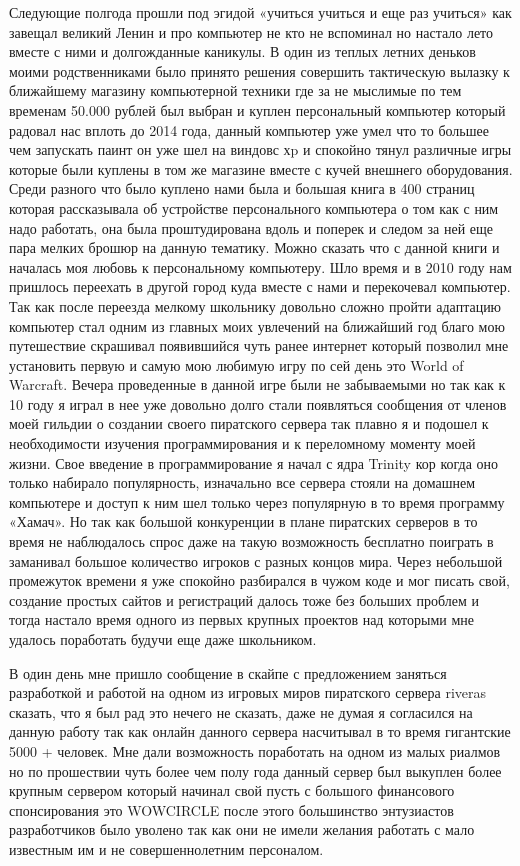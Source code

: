 \documentclass[14pt,a4paper,oneside]{extbook}
\begin{document}
		Следующие полгода прошли под эгидой «учиться учиться и еще раз учиться» как завещал великий Ленин и про компьютер не кто не вспоминал но настало лето вместе с ними и долгожданные каникулы. В один из теплых летних деньков моими родственниками было принято решения совершить тактическую вылазку к ближайшему магазину компьютерной техники где за не мыслимые по тем временам 50.000 рублей был выбран и куплен персональный компьютер который радовал нас вплоть до 2014 года, данный компьютер уже умел что то большее чем запускать паинт он уже шел на виндовс хp и спокойно тянул различные игры которые были куплены в том же магазине вместе с кучей внешнего оборудования. Среди разного что было куплено нами была и большая книга в 400 страниц которая рассказывала об устройстве персонального компьютера о том как с ним надо работать, она была проштудирована вдоль и поперек и следом за ней еще пара мелких брошюр на данную тематику. Можно сказать что с данной книги и началась моя любовь к персональному компьютеру. Шло время и в 2010 году нам пришлось переехать в другой город куда вместе с нами и перекочевал компьютер. Так как после переезда мелкому школьнику довольно сложно пройти адаптацию компьютер стал одним из главных моих увлечений на ближайший год благо мою путешествие скрашивал появившийся чуть ранее интернет который позволил мне установить первую и самую мою любимую игру по сей день это World of Warcraft. Вечера проведенные в данной игре были не забываемыми но так как к 10 году я играл в нее уже довольно долго стали появляться сообщения от членов моей гильдии о создании своего пиратского сервера так плавно я и подошел к необходимости изучения программирования и к переломному моменту моей жизни. Свое введение в программирование я начал с ядра Trinity кор когда оно только набирало популярность, изначально все сервера стояли на домашнем компьютере и доступ к ним шел только через популярную в то время программу «Хамач». Но так как большой конкуренции в плане пиратских серверов в то время не наблюдалось спрос даже на такую возможность бесплатно поиграть в заманивал большое количество игроков с разных концов мира. Через небольшой промежуток времени я уже спокойно разбирался в чужом коде и мог писать свой, создание простых сайтов и регистраций далось тоже без больших проблем и тогда настало время одного из первых крупных проектов над которыми мне удалось поработать будучи еще даже школьником.
		
		В один день мне пришло сообщение в скайпе с предложением заняться разработкой и работой на одном из игровых миров пиратского сервера riveras сказать, что я был рад это нечего не сказать, даже не думая я согласился на данную работу так как онлайн данного сервера насчитывал в то время гигантские 5000 + человек. Мне дали возможность поработать на одном из малых риалмов но по прошествии чуть более чем полу года данный сервер был выкуплен более крупным сервером который начинал свой пусть с большого финансового спонсирования это WOWCIRCLE после этого большинство энтузиастов разработчиков было уволено так как они не имели желания работать с мало известным им и не совершеннолетним персоналом.
		
\end{document}

